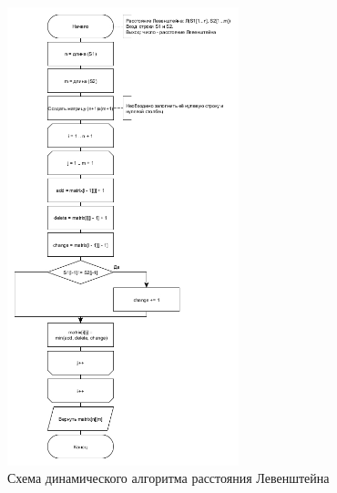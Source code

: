 \begin{figure}[h]
    \centering
    \includegraphics[width=0.6\textwidth]{images/lev_dyn.jpg}
    \caption{Схема динамического алгоритма расстояния Левенштейна}
    \label{fig:images-dyn-lev}
\end{figure}

\clearpage

